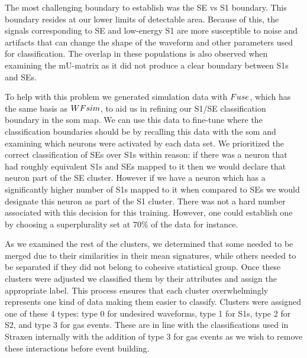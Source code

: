 The most challenging boundary to establish was the SE vs S1 boundary. This boundary resides at our lower limits of detectable area. Because of this, the signals corresponding to SE and low-energy S1 are more susceptible to noise and artifacts that can change the shape of the waveform and other parameters used for classification. The overlap in these populations is also observed when examining the mU-matrix as it did not produce a clear boundary between S1s and SEs.

To help with this problem we generated simulation data with $\sc{Fuse}$, which has the same basis as $\sc{WFsim}$, to aid us in refining our S1/SE classification boundary in the \acrshort{som} map. We can use this data to fine-tune where the classification boundaries should be by recalling this data with the \acrshort{som} and examining which neurons were activated by each data set. We prioritized the correct classification of SEs over S1s within reason: if there was a neuron that had roughly equivalent S1s and SEs mapped to it then we would declare that neuron part of the SE cluster. However if we have a neuron which has a significantly higher number of S1s mapped to it when compared to SEs we would designate this neuron as part of the S1 cluster. 
There was not a hard number associated with this decision for this training. However, one could establish one by choosing a superplurality set at 70\% of the data for instance. 

As we examined the rest of the clusters, we determined that some needed to be merged due to their similarities in their mean signatures, while others needed to be separated if they did not belong to cohesive statistical group. Once these clusters were adjusted we classified them by their attributes and assign the appropriate label. This process ensures that each cluster overwhelmingly represents one kind of data making them easier to classify.
Clusters were assigned one of these 4 types: type 0 for undesired waveforms, type 1 for S1s, type 2 for S2, and type 3 for gas events. These are in line with the classifications used in Straxen internally with the addition of type 3 for gas events as we wish to remove these interactions before event building.

